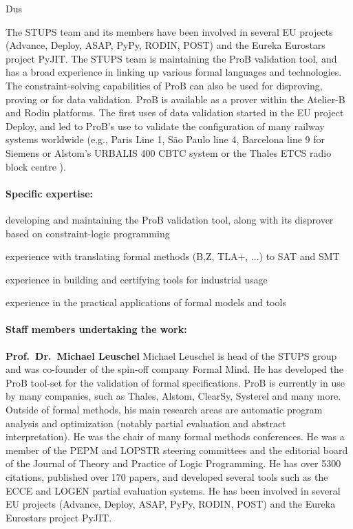 \begin{sitedescription}{Dus}


The STUPS team and its members have been involved in several EU projects
 (Advance, Deploy, ASAP, PyPy, RODIN, POST) and the Eureka Eurostars project PyJIT.
The STUPS team is maintaining the ProB validation tool, and has a broad experience
 in linking up various formal languages and technologies.
The constraint-solving capabilities of ProB can also be used for 
  disproving, proving or for data validation.
ProB is available as a prover within the Atelier-B and Rodin platforms.
The first uses of data validation started in the EU project Deploy, and led to
 ProB's use to validate the configuration of many railway systems worldwide
 (e.g.,
 Paris Line 1,  S\~{a}o Paulo line 4, Barcelona line 9 for Siemens
 or Alstom's URBALIS 400 CBTC system %
 or the Thales ETCS radio block centre
 ).

\paragraph{Specific expertise:}

\begin{compactitem}
\item {}
      developing and maintaining the ProB validation tool, along with
      its disprover based on constraint-logic programming
 \item experience with translating formal methods (B,Z, TLA+, ...)
       to SAT and SMT
 \item experience in building and certifying tools for industrial usage
 \item experience in the practical applications of formal models and tools
\end{compactitem}

\paragraph{Staff members undertaking the work:}

\textbf{Prof.\ Dr.\ Michael Leuschel}
Michael Leuschel is head of the STUPS group and was co-founder of the spin-off
company Formal Mind.
He has developed the ProB tool-set for the validation of formal specifications.
ProB is currently in use by many companies, such as Thales, Alstom, ClearSy, Systerel 
and many more.
Outside of formal methods, his main research areas are automatic program analysis and optimization (notably partial evaluation and abstract interpretation).
He was the chair of many formal methods conferences.
He was a member of the PEPM and LOPSTR steering committees and
 the editorial board of the Journal of Theory and Practice of Logic Programming.
He has over 5300 citations, published over 170 papers, 
and developed several tools such as the ECCE and LOGEN partial evaluation systems.
He has been involved in several EU projects (Advance, Deploy, ASAP, PyPy, RODIN, POST) and the Eureka Eurostars project PyJIT.


\end{sitedescription}

